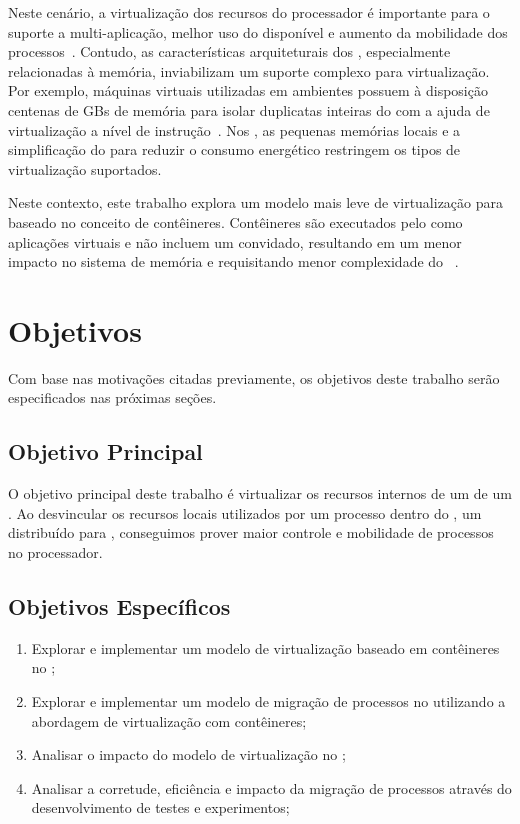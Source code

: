 Neste cenário, a virtualização dos recursos do processador é importante para o suporte a multi-aplicação, melhor uso do \hardware disponível e aumento da mobilidade dos processos~\cite{vanz2022virtualizaccao}. Contudo, as características arquiteturais dos \lws, especialmente relacionadas à memória, inviabilizam um suporte complexo para virtualização. Por exemplo, máquinas virtuais utilizadas em ambientes \cloud possuem à disposição centenas de GBs de memória para isolar duplicatas inteiras do \os com a ajuda de virtualização a nível de instrução~\cite{sharma2016containers}. Nos \lws, as pequenas memórias locais e a simplificação do \hardware para reduzir o consumo energético restringem os tipos de virtualização suportados.

Neste contexto, este trabalho explora um modelo mais leve de virtualização para \lws baseado no conceito de contêineres. Contêineres são executados pelo \os como aplicações virtuais e não incluem um \os convidado, resultando em um menor impacto no sistema de memória e requisitando menor complexidade do \hardware~\cite{thalheim2018cntr, sharma2016containers}.

\section{Objetivos}
\label{sec.goals}

Com base nas motivações citadas previamente, os objetivos deste trabalho serão especificados nas próximas seções.

\subsection{Objetivo Principal}
\label{sec.goals.primary}

O objetivo principal deste trabalho é virtualizar os recursos internos de um \cluster de um \lw. Ao desvincular os recursos locais utilizados por um processo dentro do \nanvix, um \os distribuído para \lws, conseguimos prover maior controle e mobilidade de processos no processador.

\subsection{Objetivos Específicos}
\label{sec.goals.secondary}

\begin{enumerate}[label= (\roman*)]
    \item Explorar e implementar um modelo de virtualização baseado em contêineres no \nanvix;
    \item Explorar e implementar um modelo de migração de processos no \nanvix utilizando a abordagem de virtualização com contêineres;
    \item Analisar o impacto do modelo de virtualização no \nanvix;
    \item Analisar a corretude, eficiência e impacto da migração de processos  através do desenvolvimento de testes e experimentos;
\end{enumerate}

